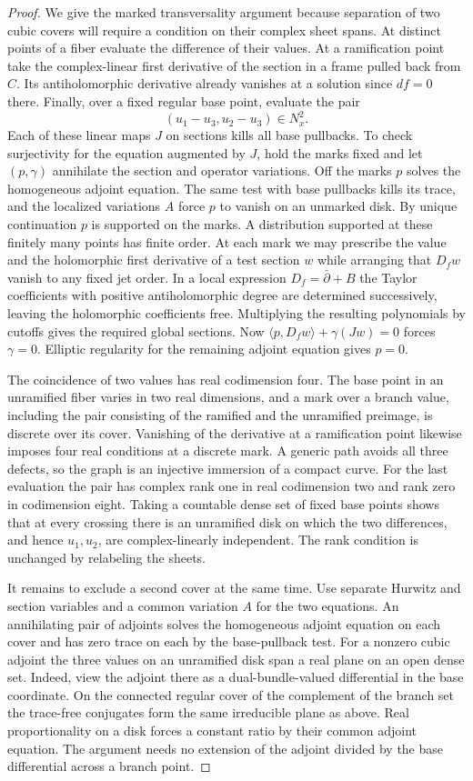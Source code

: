 \begin{proof}
We give the marked transversality argument because separation of two
cubic covers will require a condition on their complex sheet spans.
At distinct points of a fiber evaluate the difference of their values.
At a ramification point take the complex-linear first derivative of
the section in a frame pulled back from $C$. Its antiholomorphic
derivative already vanishes at a solution since $df=0$ there.
Finally, over a fixed regular base point, evaluate the pair
\[
                     (u_1-u_3,u_2-u_3)\in N_x^2.
\]
Each of these linear maps $J$ on sections kills all base pullbacks.
To check surjectivity for the equation augmented by $J$, hold the
marks fixed and let $(p,\gamma)$ annihilate the section and operator
variations. Off the marks $p$ solves the homogeneous adjoint equation.
The same test with base pullbacks kills its trace, and the localized
variations $A$ force $p$ to vanish on an unmarked disk. By unique
continuation $p$ is supported on the marks. A distribution supported
at these finitely many points has finite order. At each mark we may
prescribe the value and the holomorphic first derivative of a test
section $w$ while arranging that $D_fw$ vanish to any fixed jet order.
In a local expression $D_f=\bar\partial+B$ the Taylor coefficients
with positive antiholomorphic degree are determined successively,
leaving the holomorphic coefficients free. Multiplying the resulting
polynomials by cutoffs gives the required global sections. Now
$\langle p,D_fw\rangle+\gamma(Jw)=0$ forces $\gamma=0$. Elliptic
regularity for the remaining adjoint equation gives $p=0$.

The coincidence of two values has real codimension four. The base
point in an unramified fiber varies in two real dimensions, and a
mark over a branch value, including the pair consisting of the
ramified and the unramified preimage, is discrete over its cover.
Vanishing of the derivative at a ramification point likewise imposes
four real conditions at a discrete mark. A generic path avoids all
three defects, so the graph is an injective immersion of a compact
curve. For the last evaluation the pair has complex rank one in real
codimension two and rank zero in codimension eight. Taking a countable
dense set of fixed base points shows that at every crossing there
is an unramified disk on which the two differences, and hence
$u_1,u_2$, are complex-linearly independent. The rank condition is
unchanged by relabeling the sheets.

It remains to exclude a second cover at the same time. Use separate
Hurwitz and section variables and a common variation $A$ for the
two equations. An annihilating pair of adjoints solves the homogeneous
adjoint equation on each cover and has zero trace on each by the
base-pullback test. For a nonzero cubic adjoint the three values on
an unramified disk span a real plane on an open dense set. Indeed,
view the adjoint there as a dual-bundle-valued differential in the
base coordinate. On the connected regular cover of the complement of
the branch set the trace-free conjugates form the same irreducible
plane as above. Real proportionality on a disk forces a constant
ratio by their common adjoint equation. The argument needs no
extension of the adjoint divided by the base differential across a
branch point.


\end{proof}
